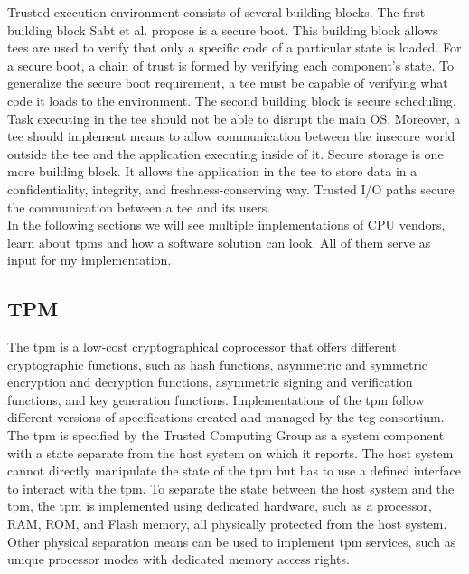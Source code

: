 Trusted execution environment consists of several building blocks. The first
building block Sabt et al. propose is a secure boot. This building block allows
\glspl{tee} are used to verify that only a specific code of a particular state
is loaded. For a secure boot, a chain of trust is formed by verifying each
component's state. To generalize the secure boot requirement, a \gls{tee} must
be capable of verifying what code it loads to the environment. The second
building block is secure scheduling. Task executing in the \gls{tee} should not
be able to disrupt the main OS. Moreover, a \gls{tee} should implement means to
allow communication between the insecure world outside the \gls{tee} and the
application executing inside of it. Secure storage is one more building block.
It allows the application in the \gls{tee} to store data in a confidentiality,
integrity, and freshness-conserving way. Trusted I/O paths secure the
communication between a \gls{tee} and its users.\\

In the following sections we will see multiple implementations of CPU vendors,
learn about \glspl{tpm} and how a software solution can look. All of them serve
as input for my implementation.

\subsection{TPM}
\label{sec:20:tpm}
The \gls{tpm} is a low-cost cryptographical coprocessor that offers different
cryptographic functions, such as hash functions, asymmetric and symmetric
encryption and decryption functions, asymmetric signing and verification
functions, and key generation functions. Implementations of the \gls{tpm} follow
different versions of specifications created and managed by the \gls{tcg}
consortium.\cite{tpm_architecture} The \gls{tpm} is specified by the Trusted
Computing Group as a system component with a state separate from the host system
on which it reports. The host system cannot directly manipulate the state of the
\gls{tpm} but has to use a defined interface to interact with the \gls{tpm}. To
separate the state between the host system and the \gls{tpm}, the \gls{tpm} is
implemented using dedicated hardware, such as a processor, RAM, ROM, and Flash
memory, all physically protected from the host system. Other physical separation
means can be used to implement \gls{tpm} services, such as unique processor
modes with dedicated memory access rights.\\

